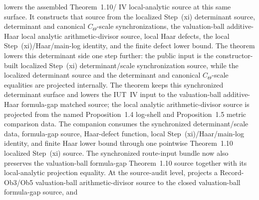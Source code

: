 \begin{proposition}
  lowers the assembled Theorem~1.10/\IUT{} IV local-analytic source at this
  same surface.  It constructs that source from the localized Step~(xi)
  determinant source, determinant and canonical \(C_\Theta\)-scale
  synchronizations, the valuation-ball additive-Haar local analytic
  arithmetic-divisor source, local Haar defects, the local
  Step~(xi)/Haar/main-log identity, and the finite defect lower bound.
  The theorem
  lowers this determinant side one step further: the public input is the
  constructor-built localized Step~(xi) determinant/scale synchronization
  source, while the localized determinant source and the determinant and
  canonical \(C_\Theta\)-scale equalities are projected internally.
  The theorem
  keeps this synchronized determinant surface and lowers the IUT~IV input to
  the valuation-ball additive-Haar formula-gap matched source; the local
  analytic arithmetic-divisor source is projected from the named
  Proposition~1.4 log-shell and Proposition~1.5 metric comparison data.
  The companion
  consumes the synchronized determinant/scale data, formula-gap source,
  Haar-defect function, local Step~(xi)/Haar/main-log identity, and finite
  Haar lower bound through one pointwise Theorem~1.10 localized Step~(xi)
  source.
  The synchronized route-input bundle now also preserves the valuation-ball
  formula-gap Theorem~1.10 source together with its local-analytic projection
  equality.
  At the source-audit level,
  projects a Record-Ob3/Ob5 valuation-ball arithmetic-divisor source to the
  closed valuation-ball formula-gap source, and

\end{proposition}
